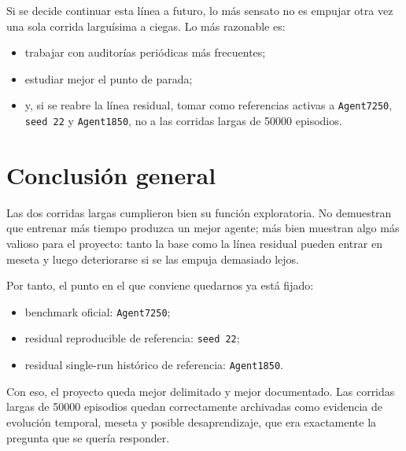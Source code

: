 \documentclass[11pt,a4paper]{article}
\begin{document}
Si se decide continuar esta l\'inea a futuro, lo m\'as sensato no es empujar otra vez una sola corrida largu\'isima a ciegas. Lo m\'as razonable es:
\begin{itemize}
    \item trabajar con auditor\'ias peri\'odicas m\'as frecuentes;
    \item estudiar mejor el punto de parada;
    \item y, si se reabre la l\'inea residual, tomar como referencias activas a \texttt{Agent7250}, \texttt{seed 22} y \texttt{Agent1850}, no a las corridas largas de 50000 episodios.
\end{itemize}

\section*{Conclusi\'on general}
Las dos corridas largas cumplieron bien su funci\'on exploratoria. No demuestran que entrenar m\'as tiempo produzca un mejor agente; m\'as bien muestran algo m\'as valioso para el proyecto: tanto la base como la l\'inea residual pueden entrar en meseta y luego deteriorarse si se las empuja demasiado lejos.

Por tanto, el punto en el que conviene quedarnos ya est\'a fijado:
\begin{itemize}
    \item benchmark oficial: \texttt{Agent7250};
    \item residual reproducible de referencia: \texttt{seed 22};
    \item residual single-run hist\'orico de referencia: \texttt{Agent1850}.
\end{itemize}

Con eso, el proyecto queda mejor delimitado y mejor documentado. Las corridas largas de 50000 episodios quedan correctamente archivadas como evidencia de evoluci\'on temporal, meseta y posible desaprendizaje, que era exactamente la pregunta que se quer\'ia responder.
\end{document}
